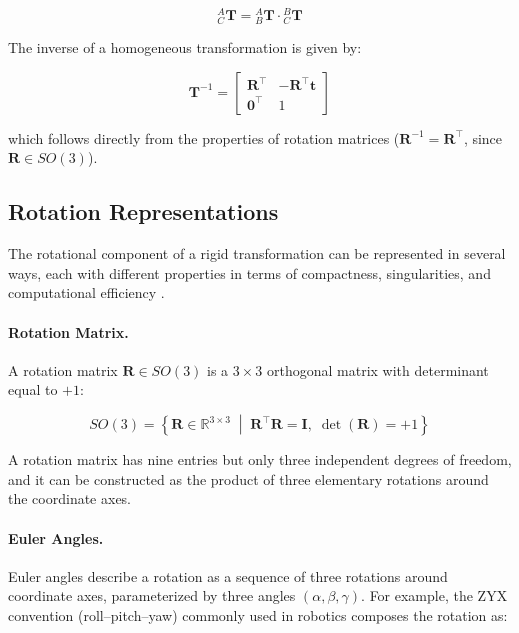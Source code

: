 \begin{equation}
    {}^A_C\mathbf{T} = {}^A_B\mathbf{T} \cdot {}^B_C\mathbf{T}
    \label{eq:chain}
\end{equation}

The inverse of a homogeneous transformation is given by:

\begin{equation}
    \mathbf{T}^{-1} =
    \begin{bmatrix}
        \mathbf{R}^{\top} & -\mathbf{R}^{\top}\mathbf{t} \\
        \mathbf{0}^{\top} & 1
    \end{bmatrix}
    \label{eq:T_inverse}
\end{equation}

\noindent which follows directly from the properties of rotation matrices
($\mathbf{R}^{-1} = \mathbf{R}^{\top}$, since $\mathbf{R} \in SO(3)$).

\subsection{Rotation Representations}
\label{subsec:rotations}

The rotational component of a rigid transformation can be represented in several
ways, each with different properties in terms of compactness, singularities, and
computational efficiency \cite{siciliano2009robotics, murray1994mathematical}.


\paragraph{Rotation Matrix.}
A rotation matrix $\mathbf{R} \in SO(3)$ is a $3\times3$ orthogonal matrix with
determinant equal to $+1$:

\begin{equation}
    SO(3) = \left\{ \mathbf{R} \in \mathbb{R}^{3\times3} \;\middle|\;
    \mathbf{R}^{\top}\mathbf{R} = \mathbf{I},\; \det(\mathbf{R}) = +1 \right\}
    \label{eq:SO3}
\end{equation}

\noindent A rotation matrix has nine entries but only three independent degrees
of freedom, and it can be constructed as the product of three elementary
rotations around the coordinate axes.



\paragraph{Euler Angles.}
Euler angles describe a rotation as a sequence of three rotations around
coordinate axes, parameterized by three angles $(\alpha, \beta, \gamma)$.
For example, the ZYX convention (roll--pitch--yaw) commonly used in robotics
composes the rotation as:


